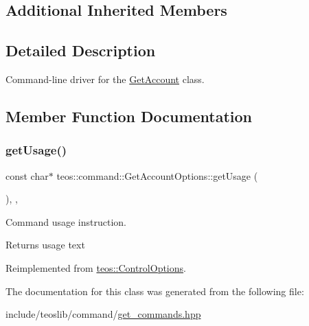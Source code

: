 \subsection*{Additional Inherited Members}


\subsection{Detailed Description}
Command-\/line driver for the \mbox{\hyperlink{classteos_1_1command_1_1_get_account}{Get\+Account}} class. 

\subsection{Member Function Documentation}
\mbox{\label{classteos_1_1command_1_1_get_account_options_a987381bcf3f687b7babfe197edf0dc26}} 
\subsubsection{\texorpdfstring{get\+Usage()}{getUsage()}}
{\footnotesize\ttfamily const char$\ast$ teos\+::command\+::\+Get\+Account\+Options\+::get\+Usage (\begin{DoxyParamCaption}{ }\end{DoxyParamCaption})\hspace{0.3cm}{\ttfamily [inline]}, {\ttfamily [protected]}, {\ttfamily [virtual]}}



Command \textquotesingle{}usage\textquotesingle{} instruction. 

\begin{DoxyReturn}{Returns}
usage text 
\end{DoxyReturn}


Reimplemented from \mbox{\hyperlink{classteos_1_1_control_options_a0aa5671f9bc750ed5280c26c543874f3}{teos\+::\+Control\+Options}}.



The documentation for this class was generated from the following file\+:\begin{DoxyCompactItemize}
\item 
include/teoslib/command/\mbox{\hyperlink{get__commands_8hpp}{get\+\_\+commands.\+hpp}}\end{DoxyCompactItemize}
